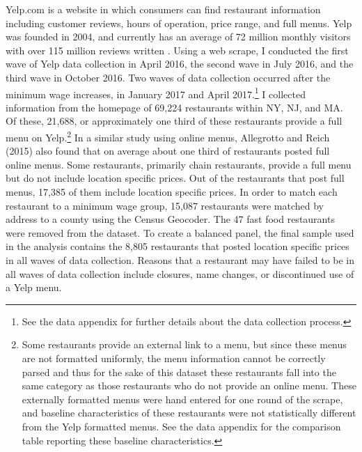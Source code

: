 \documentclass[11pt]{article}
\begin{document}
Yelp.com is a website in which consumers can find restaurant information including customer reviews, hours of operation, price range, and full menus. Yelp was founded in 2004, and currently has an average of 72 million monthly visitors with over 115 million reviews written \cite{yelpstat}. Using a web scrape, I conducted the first wave of Yelp data collection in April 2016, the second wave in July 2016, and the third wave in October 2016. Two waves of data collection occurred after the minimum wage increases, in January 2017 and April 2017.\footnote{See the data appendix for further details about the data collection process.} I collected information from the homepage of 69,224 restaurants within NY, NJ, and MA. Of these, 21,688, or approximately one third of these restaurants provide a full menu on Yelp.\footnote{Some restaurants provide an external link to a menu, but since these menus are not formatted uniformly, the menu information cannot be correctly parsed and thus for the sake of this dataset these restaurants fall into the same category as those restaurants who do not provide an online menu. These externally formatted menus were hand entered for one round of the scrape, and baseline characteristics of these restaurants were not statistically different from the Yelp formatted menus. See the data appendix for the comparison table reporting these baseline characteristics.} In a similar study using online menus, Allegrotto and Reich (2015) also found that on average about one third of restaurants posted full online menus\nocite{allegretto2016local}. Some restaurants, primarily chain restaurants, provide a full menu but do not include location specific prices. Out of the restaurants that post full menus, 17,385 of them include location specific prices. In order to match each restaurant to a minimum wage group, 15,087 restaurants were matched by address to a county using the Census Geocoder. The 47 fast food restaurants were removed from the dataset. To create a balanced panel, the final sample used in the analysis contains the 8,805 restaurants that posted location specific prices in all waves of data collection. Reasons that a restaurant may have failed to be in all waves of data collection include closures, name changes, or discontinued use of a Yelp menu. 


\end{document}

